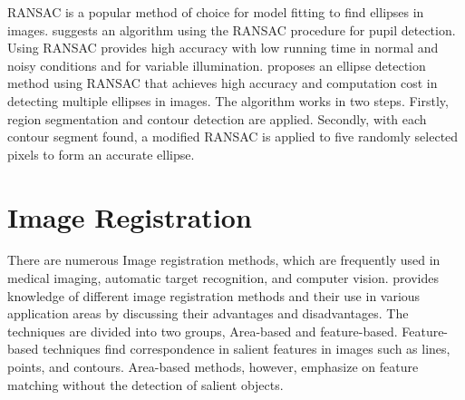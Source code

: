 \noindent RANSAC is a popular method of choice for model fitting to find ellipses in images. \cite{Bozomitu} suggests an algorithm using the RANSAC procedure for pupil detection. Using RANSAC provides high accuracy with low running time in normal and noisy conditions and for variable illumination. \cite{Xie} proposes an ellipse detection method using RANSAC that achieves high accuracy and computation cost in detecting multiple ellipses in images. The algorithm works in two steps. Firstly, region segmentation and contour detection are applied. Secondly, with each contour segment found, a modified RANSAC is applied to five randomly selected pixels to form an accurate ellipse.

\section{Image Registration}
There are numerous Image registration methods, which are frequently used in medical imaging, automatic target recognition, and computer vision. \cite{Saxena} provides knowledge of different image registration methods and their use in various application areas by discussing their advantages and disadvantages. The techniques are divided into two groups, Area-based and feature-based. Feature-based techniques find correspondence in salient features in images such as lines, points, and contours. Area-based methods, however, emphasize on feature matching without the detection of salient objects.  \\

